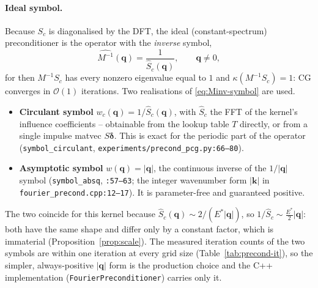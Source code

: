 \documentclass[11pt,a4paper]{article}
\newcommand{\Es}{E^{*}}
\newcommand{\Order}{\mathcal{O}}
\newcommand{\abs}[1]{\left\lvert #1 \right\rvert}
\newcommand{\code}[1]{\texttt{#1}}
\theoremstyle{definition}
\theoremstyle{remark}
\begin{document}
\paragraph{Ideal symbol.}
Because $S_c$ is diagonalised by the DFT, the ideal (constant-spectrum)
preconditioner is the operator with the \emph{inverse} symbol,
\begin{equation}
  \widehat{M^{-1}}(\mathbf q) = \frac{1}{\widehat S_c(\mathbf q)},
  \qquad \mathbf q\ne 0,
  \label{eq:Minv-symbol}
\end{equation}
for then $M^{-1}S_c$ has every nonzero eigenvalue equal to $1$ and
$\kappa(M^{-1}S_c)=1$: CG converges in $\Order(1)$ iterations. Two realisations of
\eqref{eq:Minv-symbol} are used.
\begin{itemize}
\item \textbf{Circulant symbol} $w_c(\mathbf q)=1/\widehat S_c(\mathbf q)$, with
$\widehat S_c$ the FFT of the kernel's influence coefficients -- obtainable from
the lookup table $T$ directly, or from a single impulse matvec
$S\boldsymbol\delta$. This is exact for the periodic part of the operator
(\code{symbol\_circulant}, \code{experiments/precond\_pcg.py:66--80}).
\item \textbf{Asymptotic symbol} $w(\mathbf q)=\abs{\mathbf q}$, the continuous
inverse of the $1/\abs{\mathbf q}$ symbol (\code{symbol\_absq}, \code{:57--63};
the integer wavenumber form $\abs{\mathbf k}$ in
\code{fourier\_precond.cpp:12--17}). It is parameter-free and guaranteed
positive.
\end{itemize}
The two coincide for this kernel because $\widehat S_c(\mathbf q)\sim
2/(\Es\abs{\mathbf q})$, so $1/\widehat S_c\sim\tfrac{\Es}{2}\abs{\mathbf q}$:
both have the same shape and differ only by a constant factor, which is
immaterial (Proposition~\ref{prop:scale}). The measured iteration counts of the
two symbols are within one iteration at every grid size
(Table~\ref{tab:precond-it}), so the simpler, always-positive $\abs{\mathbf q}$
form is the production choice and the C++ implementation
(\code{FourierPreconditioner}) carries only it.
\end{document}
